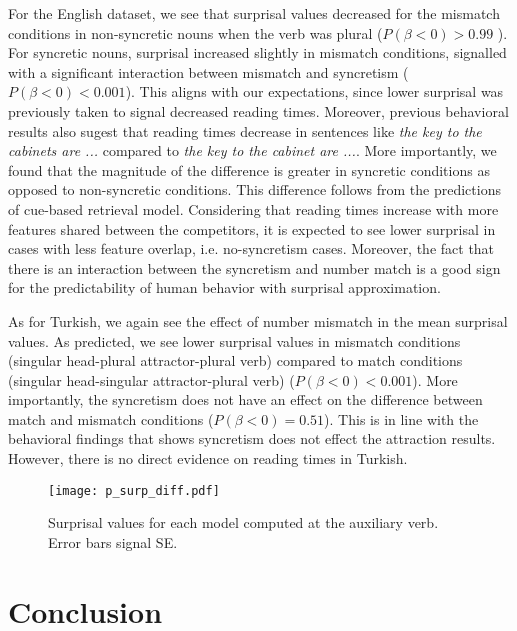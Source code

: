 \documentclass[10pt,letterpaper]{article}
\begin{document}
For the English dataset, we see that surprisal values decreased for the mismatch conditions in non-syncretic nouns when the verb was plural ($P(\beta < 0) > 0.99$  ). For syncretic nouns, surprisal increased slightly in mismatch conditions, signalled with a significant interaction between mismatch and syncretism ($P(\beta < 0) < 0.001$). This aligns with our expectations, since lower surprisal was previously taken to signal decreased reading times. Moreover, previous behavioral results also sugest that reading times decrease in sentences like \textit{the key to the cabinets are ...} compared to \textit{the key to the cabinet are ...}. More importantly, we found that the magnitude of the difference is greater in syncretic conditions  as opposed to non-syncretic conditions. This difference follows from the predictions of cue-based retrieval model. Considering that reading times increase with more features shared between the competitors, it is expected to see lower surprisal in cases with less feature overlap, i.e. no-syncretism cases. Moreover, the fact that there is an interaction between the syncretism and number match is a good sign for the predictability of human behavior with surprisal approximation.

As for Turkish, we again see the effect of number mismatch in the mean surprisal values. As predicted, we see lower surprisal values in mismatch conditions (singular head-plural attractor-plural verb) compared to match conditions (singular head-singular attractor-plural verb) ($P(\beta < 0) < 0.001$). More importantly, the syncretism does not have an effect on the difference between match and mismatch conditions ($P(\beta < 0) = 0.51$). This is in line with the behavioral findings that shows syncretism does not effect the attraction results. However, there is no direct evidence on reading times in Turkish.

\begin{figure}[htb!]
    \centering
    \texttt{[image: p\_surp\_diff.pdf]}
    \vspace*{-2em}\caption{Surprisal values for each model computed at the auxiliary verb. Error bars signal SE.}\vspace*{-2em}
    \label{fig:surp}
\end{figure}






\section{Conclusion}
\end{document}
